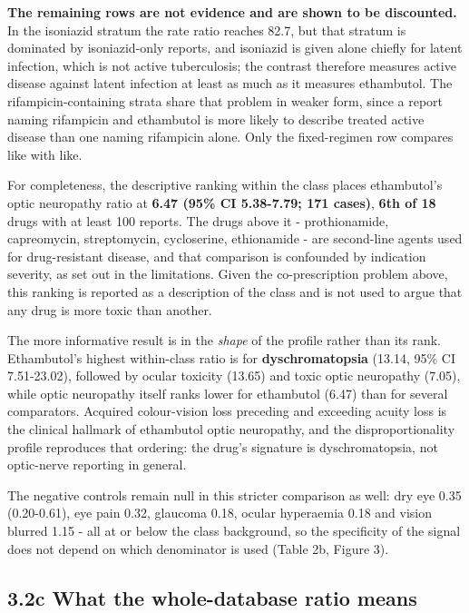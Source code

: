 \documentclass[utf8]{FrontiersinVancouver}
\begin{document}
\textbf{The remaining rows are not evidence and are shown to be discounted.} In the isoniazid stratum the rate ratio reaches 82.7, but that stratum is dominated by isoniazid-only reports, and isoniazid is given alone chiefly for latent infection, which is not active tuberculosis; the contrast therefore measures active disease against latent infection at least as much as it measures ethambutol. The rifampicin-containing strata share that problem in weaker form, since a report naming rifampicin and ethambutol is more likely to describe treated active disease than one naming rifampicin alone. Only the fixed-regimen row compares like with like.

For completeness, the descriptive ranking within the class places ethambutol's optic neuropathy ratio at \textbf{6.47 (95\% CI 5.38-7.79; 171 cases)}, \textbf{6th of 18} drugs with at least 100 reports. The drugs above it - prothionamide, capreomycin, streptomycin, cycloserine, ethionamide - are second-line agents used for drug-resistant disease, and that comparison is confounded by indication severity, as set out in the limitations. Given the co-prescription problem above, this ranking is reported as a description of the class and is not used to argue that any drug is more toxic than another.

The more informative result is in the \textit{shape} of the profile rather than its rank. Ethambutol's highest within-class ratio is for \textbf{dyschromatopsia} (13.14, 95\% CI 7.51-23.02), followed by ocular toxicity (13.65) and toxic optic neuropathy (7.05), while optic neuropathy itself ranks lower for ethambutol (6.47) than for several comparators. Acquired colour-vision loss preceding and exceeding acuity loss is the clinical hallmark of ethambutol optic neuropathy, and the disproportionality profile reproduces that ordering: the drug's signature is dyschromatopsia, not optic-nerve reporting in general.

The negative controls remain null in this stricter comparison as well: dry eye 0.35 (0.20-0.61), eye pain 0.32, glaucoma 0.18, ocular hyperaemia 0.18 and vision blurred 1.15 - all at or below the class background, so the specificity of the signal does not depend on which denominator is used (Table 2b, Figure 3).

\subsection{3.2c What the whole-database ratio means}
\end{document}
